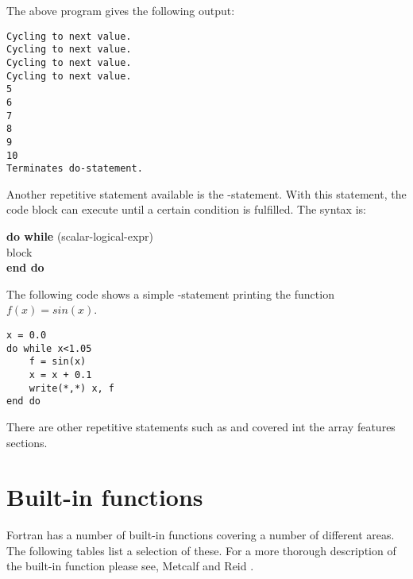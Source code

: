 The above program gives the following output:

\cmdmode

\begin{lstlisting}[texcl]
Cycling to next value.
Cycling to next value.
Cycling to next value.
Cycling to next value.
5
6
7
8
9
10
Terminates do-statement.
\end{lstlisting}

\fmode

Another repetitive statement available is the -statement. With this statement, the code block can execute until a certain condition is fulfilled. The syntax is:

\begin{fsyntax}
\textbf{do while} (scalar-logical-expr)\\
\ftab block\\
\textbf{end do}
\end{fsyntax}

The following code shows a simple -statement printing the function $f(x)=sin(x)$.

\begin{lstlisting}
x = 0.0
do while x<1.05
    f = sin(x)
    x = x + 0.1
    write(*,*) x, f
end do
\end{lstlisting}

There are other repetitive statements such as  and  covered int the array features sections.

\section{Built-in functions}

Fortran has a number of built-in functions covering a number of different areas. The following tables list a selection of these. For a more thorough description of the built-in function please see, Metcalf and Reid \cite{metcalf00}.

